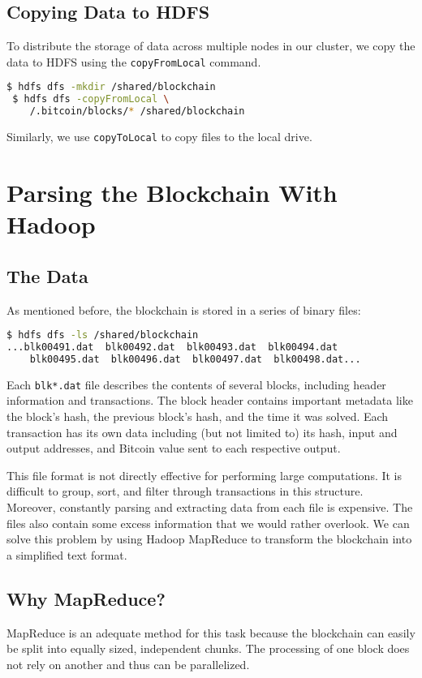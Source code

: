 \documentclass[9pt,twocolumn,twoside]{idsi}
\begin{document}
\subsection{Copying Data to HDFS}

To distribute the storage of data across multiple nodes in our cluster, we copy the data to HDFS using the \lstinline{copyFromLocal} command.

\begin{lstlisting}[language=bash]
 $ hdfs dfs -mkdir /shared/blockchain
 $ hdfs dfs -copyFromLocal \
    /.bitcoin/blocks/* /shared/blockchain
\end{lstlisting}

Similarly, we use \lstinline{copyToLocal} to copy files to the local drive.

\section{Parsing the Blockchain With Hadoop}
\subsection{The Data}
As mentioned before, the blockchain is stored in a series of binary files:
\begin{lstlisting}[language=bash]
 $ hdfs dfs -ls /shared/blockchain
...blk00491.dat  blk00492.dat  blk00493.dat  blk00494.dat
    blk00495.dat  blk00496.dat  blk00497.dat  blk00498.dat...
\end{lstlisting}

Each \lstinline{blk*.dat} file describes the contents of several blocks, including header information and transactions. The block header contains important metadata like the block's hash, the previous block's hash, and the time it was solved. Each transaction has its own data including (but not limited to) its hash, input and output addresses, and Bitcoin value sent to each respective output.

This file format is not directly effective for performing large computations. It is difficult to group, sort, and filter through transactions in this structure. Moreover, constantly parsing and extracting data from each file is expensive. The files also contain some excess information that we would rather overlook. We can solve this problem by using Hadoop MapReduce to transform the blockchain into a simplified text format.

\subsection{Why MapReduce?}
MapReduce is an adequate method for this task because the blockchain can easily be split into equally sized, independent chunks. The processing of one block does not rely on another and thus can be parallelized.
\end{document}
